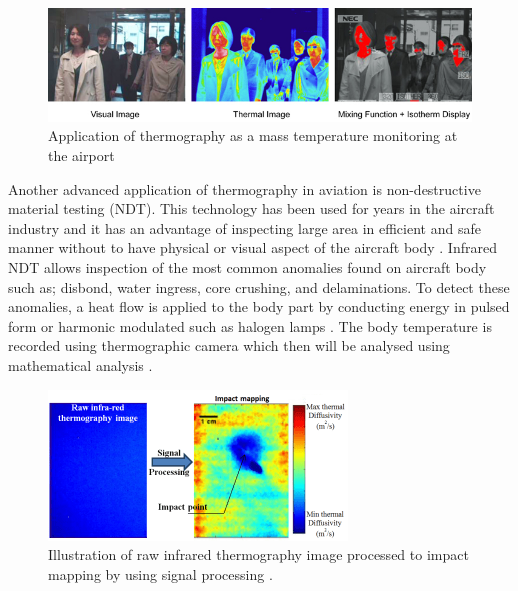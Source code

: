 \begin{figure}[!ht]
    \centering
    \includegraphics[scale=0.6]{Figures/IR_airport.jpg}
    \caption{Application of thermography as a mass temperature monitoring at the airport \cite{AnonymousBodyCO.LTD.}}
    \label{fig:airport_IR}
\end{figure}

\noindent Another advanced application of thermography in aviation is non-destructive material testing (NDT). This technology has been used for years in the aircraft industry and it has an advantage of inspecting large area in efficient and safe manner without to have physical or visual aspect of the aircraft body \cite{Ibarra-CastanedoInfraredMaterials}. Infrared NDT allows inspection of  the most common anomalies found on aircraft body such as; disbond, water ingress, core crushing, and delaminations. To detect these anomalies, a heat flow is applied to the body part by conducting energy in pulsed form or harmonic modulated such as halogen lamps \cite{Stumper2015ThermalAviation}. The body temperature is recorded using thermographic camera which then will be analysed using mathematical analysis \cite{Anonymous2013InformationImprovement}.\\

\begin{figure}[!ht]
    \centering
    \includegraphics[scale=1.2]{Figures/IR_NDT.png}
    \caption{Illustration of raw infrared thermography image processed to impact mapping by using signal processing \cite{Non-destructiveLab}.}
    \label{fig:ndt_av}
\end{figure}
 
